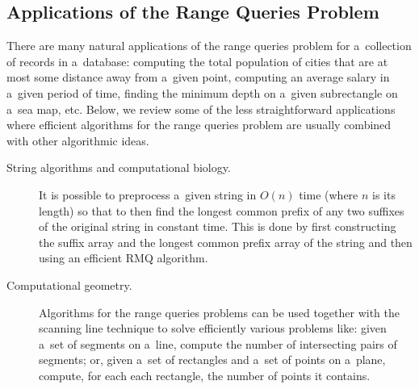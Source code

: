 \subsection{Applications of the Range Queries Problem}\label{subseq:rmqapp}
There are many natural applications of the range queries problem for a~collection of records in a~database: computing the total population of cities that are at most some distance away from a~given point, computing an average salary in a~given period of time, finding the minimum depth on a~given subrectangle on a~sea map, etc. Below, we review some of the less straightforward applications where efficient algorithms for the range queries problem are usually combined with other algorithmic ideas.
\begin{description}
\item[String algorithms and computational biology.]
It is possible to preprocess a~given string in $O(n)$ time (where $n$ is its length) so that to then find the longest common prefix of any two suffixes of the original string in constant time. This is done by first constructing the suffix array and the longest common prefix array of the string and then using an efficient RMQ algorithm.

\item[Computational geometry.] Algorithms for the range queries problems can be used together with the scanning line technique to solve efficiently various problems like: given a~set of segments on a~line, compute the number of intersecting pairs of segments; or, given a~set of rectangles and a~set of points on a~plane, compute, for each each rectangle, the number of points it contains. 


\end{description}


